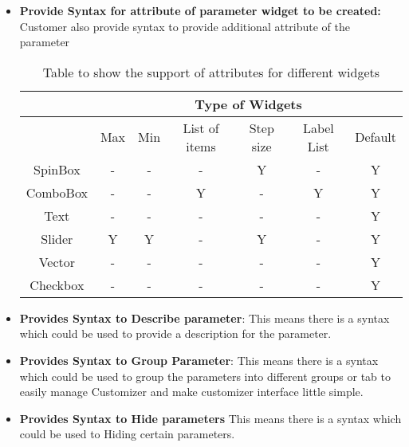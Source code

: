\begin{itemize}
\begin{enumerate}
\begin{table}[h]
            \label{table2}
        \end{table}
       
    \end{enumerate}
   
    \item \textbf{Provide Syntax for attribute of parameter widget to be created:}
    Customer also provide syntax to provide additional attribute of the parameter
   
    \begin{table}[h]
        \centering
        \caption{Table to show the support of attributes  for different widgets}
        \begin{tabular}{ |c|c|c|c|c|c|c| }
            \hline
            & \multicolumn{6}{|c|}{Type of Widgets} \\
            \hline
            &Max&    Min &    List of items&    Step size&    Label List     &Default     \\ [0.5ex]
            \hline
            SpinBox& -&    -&    -&    Y&     -& Y \\ \hline
            ComboBox&    -&    -&    Y&    -&    Y&Y \\ \hline
            Text&    -&    -&    -&    -&    -&Y \\ \hline
            Slider&    Y&    Y&    -&    Y&    -&Y \\ \hline
            Vector&    -&    -&    -&    -&    -&Y \\ \hline
            Checkbox&    -&    -&    -&    -&    -&Y \\ [1ex]
            \hline
        \end{tabular}
        \label{table2}
    \end{table}
   
    \item {\bf Provides Syntax to Describe parameter}:
    This means there is a syntax which could be used to provide a description for the parameter.
   
    \item \textbf{Provides Syntax to Group Parameter}:
    This means there is a syntax which could be used to group the parameters into different groups or tab to easily manage Customizer and make customizer interface little simple.
   
    \item \textbf{Provides Syntax to Hide parameters}
    This means there is a syntax which could be used to Hiding certain parameters.
   

\end{itemize}
